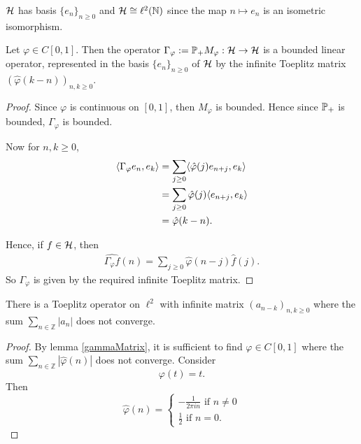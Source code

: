 \documentclass{unswmaths}
\begin{document}
\begin{remark}
    $\mathcal{H}$ has basis $\{e_n\}_{n\geq 0}$ and $\mathcal{H} \cong \ell^2(\mathbb{N})$
    since the map $n\mapsto e_n$ is an isometric isomorphism.
\end{remark}
\begin{lemma}
\label{gammaMatrix}
    Let $\varphi \in C[0,1]$. Then the operator $\Gamma_\varphi := \mathbb{P}_+ M_\varphi :\mathcal{H}\rightarrow\mathcal{H}$
    is a bounded linear operator, represented in the basis $\{e_n\}_{n\geq 0}$
    of $\mathcal{H}$ by the infinite Toeplitz matrix $(\hat{\varphi}(k-n))_{n,k\geq 0}$.
\end{lemma}
\begin{proof}
    Since $\varphi$ is continuous on $[0,1]$, then $M_\varphi$ is bounded. Hence since $\mathbb{P}_+$
    is bounded, $\Gamma_\varphi$ is bounded. 
    
    Now for $n,k\geq 0$,
    \begin{align*}
        \langle \Gamma_\varphi e_n,e_k\rangle &= \sum_{j\geq0} \langle \hat{\varphi}(j)e_{n+j},e_k\rangle\\
        &= \sum_{j\geq 0} \hat{\varphi}(j) \langle e_{n+j},e_k\rangle\\
        &= \hat{\varphi}(k-n).
    \end{align*}
    
    Hence, if $f \in \mathcal{H}$, then
    \begin{align*}
        \widehat{\Gamma_\varphi f}(n) = \sum_{j\geq 0} \hat{\varphi}(n-j)\hat{f}(j).
    \end{align*}
    So $\Gamma_\varphi$ is given by the required infinite Toeplitz matrix.
\end{proof}
\begin{theorem}
    There is a Toeplitz operator on $\ell^2$ with infinite matrix $(a_{n-k})_{n,k\geq 0}$
    where the sum $\sum_{n\in \mathbb{Z}} |a_n|$ does not converge.
\end{theorem}
\begin{proof}
    By lemma \ref{gammaMatrix}, it is sufficient to find $\varphi \in C[0,1]$
    where the sum $\sum_{n\in \mathbb{Z}} |\hat{\varphi}(n)|$
    does not converge.
    Consider
    \begin{equation*}
        \varphi(t) = t.
    \end{equation*}
    Then
    \begin{equation*}
        \hat{\varphi}(n) = \begin{cases}
            -\frac{1}{2\pi i n}\text{ if }n\neq 0\\
            \frac{1}{2}\text{ if }n = 0.
        \end{cases}
    \end{equation*}
\end{proof}
\end{document}
